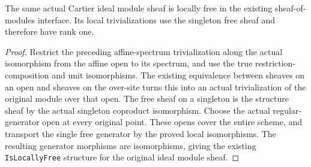 \begin{lemma}
\label{lem:cartier-ideal-locally-free-module}
\leanok
The same actual Cartier ideal module sheaf is locally free in the existing
sheaf-of-modules interface.  Its local trivializations use the singleton
free sheaf and therefore have rank one.
\end{lemma}
\begin{proof}
Restrict the preceding affine-spectrum trivialization along the actual
isomorphism from the affine open to its spectrum, and use the true
restriction-composition and unit isomorphisms.  The existing equivalence
between sheaves on an open and sheaves on the over-site turns this into
an actual trivialization of the original module over that open.
The free sheaf on a singleton is the structure sheaf by the actual
singleton coproduct isomorphism.  Choose the actual regular-generator
open at every original point.  These opens cover the entire scheme,
and transport the single free generator by the proved local isomorphisms.
The resulting generator morphisms are isomorphisms, giving the existing
\texttt{IsLocallyFree} structure for the original ideal module sheaf.
\end{proof}
